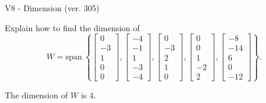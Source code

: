 \begin{exercise}
  \begin{exerciseTitle}V8 - Dimension (ver. 305)\end{exerciseTitle}
  \begin{exerciseStatement}
    Explain how to find the dimension of 
\[W=\mathrm{span}\ \left\{\left[\begin{array}{r}
0 \\
-3 \\
1 \\
0 \\
0
\end{array}\right] , \left[\begin{array}{r}
-4 \\
-1 \\
1 \\
-3 \\
-4
\end{array}\right] , \left[\begin{array}{r}
0 \\
-3 \\
2 \\
1 \\
0
\end{array}\right] , \left[\begin{array}{r}
0 \\
0 \\
1 \\
-2 \\
2
\end{array}\right] , \left[\begin{array}{r}
-8 \\
-14 \\
6 \\
0 \\
-12
\end{array}\right]\right\}.\]



  \end{exerciseStatement}
  \begin{exerciseAnswer}
   The dimension of \(W\) is  \(4\).
  


  \end{exerciseAnswer}
\end{exercise}